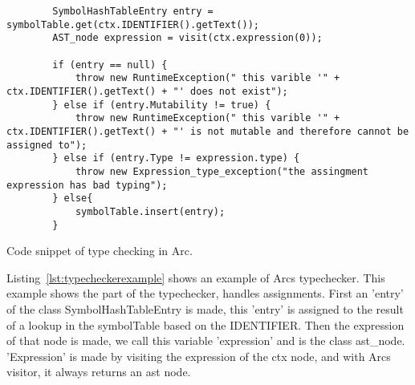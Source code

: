 \begin{listing}[htb!]
    \begin{verbatim}
        SymbolHashTableEntry entry = symbolTable.get(ctx.IDENTIFIER().getText());
        AST_node expression = visit(ctx.expression(0));

        if (entry == null) {
            throw new RuntimeException(" this varible '" + ctx.IDENTIFIER().getText() + "' does not exist");
        } else if (entry.Mutability != true) {
            throw new RuntimeException(" this varible '" + ctx.IDENTIFIER().getText() + "' is not mutable and therefore cannot be assigned to");
        } else if (entry.Type != expression.type) {
            throw new Expression_type_exception("the assingment expression has bad typing");
        } else{
            symbolTable.insert(entry);
        }
    \end{verbatim}
    \caption{Code snippet of type checking in Arc.}
    \label{lst:typecheckerexample}
\end{listing}



Listing~\ref{lst:typecheckerexample} shows an example of Arcs typechecker. This example shows the part of the typechecker, handles assignments. First an 'entry' of the class SymbolHashTableEntry is made, this 'entry' is assigned to the result of a lookup in the symbolTable based on the IDENTIFIER. Then the expression of that node is made, we call this variable 'expression' and is the class \gls{ast}\_node. 'Expression' is made by visiting the expression of the ctx node, and with Arcs visitor, it always returns an \gls{ast} node.

